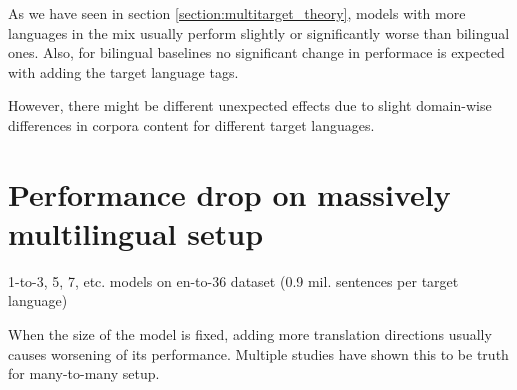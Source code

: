 As we have seen in section \ref{section:multitarget_theory}, models with more languages
in the mix usually perform slightly or significantly worse than bilingual ones.
Also, for bilingual baselines no significant change in performace is expected with adding
the target language tags.

However, there might be different unexpected effects due to slight domain-wise differences
in corpora content for different target languages.

\section{Performance drop on massively multilingual setup}
1-to-3, 5, 7, etc. models on en-to-36 dataset (0.9 mil. sentences per target language)

When the size of the model is fixed, adding more translation directions usually causes
worsening of its performance. Multiple studies have shown this to be truth for
many-to-many setup.



